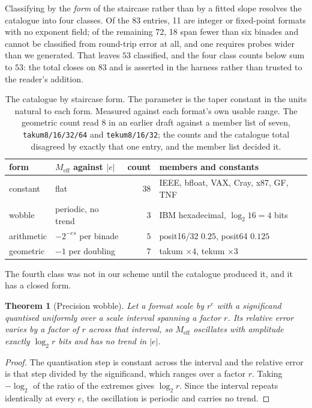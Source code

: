 \documentclass[11pt]{article}
\newtheorem{theorem}{Theorem}
\theoremstyle{definition}
\begin{document}
Classifying by the \emph{form} of the staircase rather than by a fitted slope
resolves the catalogue into four classes. Of the 83 entries, 11 are integer or
fixed-point formats with no exponent field; of the remaining 72, 18 span fewer
than six binades and cannot be classified from round-trip error at all, and one
requires probes wider than we generated. That leaves $53$ classified, and the
four class counts below sum to $53$: the total closes on $83$ and is asserted in
the harness rather than trusted to the reader's addition.

\begin{table}[t]\centering
\caption{The catalogue by staircase form. The parameter is the taper constant in
the units natural to each form. Measured against each format's own usable range.
The geometric count read $8$ in an earlier draft against a member list of seven,
\texttt{takum8/16/32/64} and \texttt{tekum8/16/32}; the counts and the catalogue
total disagreed by exactly that one entry, and the member list decided it.}
\label{tab:taxonomy}
\begin{tabular}{llrl}
\toprule
form & $M_{\mathrm{eff}}$ against $|e|$ & count & members and constants \\
\midrule
constant   & flat                          & $38$ & IEEE, bfloat, VAX, Cray, x87, GF, TNF \\
wobble     & periodic, no trend            & $3$  & IBM hexadecimal, $\log_2 16 = 4$ bits \\
arithmetic & $-2^{-es}$ per binade         & $5$  & posit16/32 $0.25$, posit64 $0.125$ \\
geometric  & $-1$ per doubling             & $7$  & takum $\times 4$, tekum $\times 3$ \\
\bottomrule
\end{tabular}
\end{table}

The fourth class was not in our scheme until the catalogue produced it, and it has
a closed form.

\begin{theorem}[Precision wobble]
\label{thm:wobble}
Let a format scale by $r^{e}$ with a significand quantised uniformly over a
scale interval spanning a factor $r$. Its relative error varies by a factor of
$r$ across that interval, so $M_{\mathrm{eff}}$ oscillates with amplitude exactly
$\log_2 r$ bits and has no trend in $|e|$.
\end{theorem}

\begin{proof}
The quantisation step is constant across the interval and the relative error is
that step divided by the significand, which ranges over a factor $r$. Taking
$-\log_2$ of the ratio of the extremes gives $\log_2 r$. Since the interval
repeats identically at every $e$, the oscillation is periodic and carries no
trend.
\end{proof}
\end{document}
